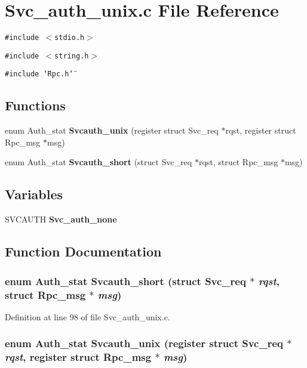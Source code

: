 \section{Svc\_\-auth\_\-unix.c File Reference}
\label{Svc__auth__unix_8c}
{\tt \#include $<$stdio.h$>$}\par
{\tt \#include $<$string.h$>$}\par
{\tt \#include \char`\"{}Rpc.h\char`\"{}}\par
\subsection*{Functions}
\begin{CompactItemize}
\item 
enum Auth\_\-stat {\bf Svcauth\_\-unix} (register struct Svc\_\-req $\ast$rqst, register struct Rpc\_\-msg $\ast$msg)
\item 
enum Auth\_\-stat {\bf Svcauth\_\-short} (struct Svc\_\-req $\ast$rqst, struct Rpc\_\-msg $\ast$msg)
\end{CompactItemize}
\subsection*{Variables}
\begin{CompactItemize}
\item 
SVCAUTH {\bf Svc\_\-auth\_\-none}
\end{CompactItemize}


\subsection{Function Documentation}
\subsubsection{\setlength{\rightskip}{0pt plus 5cm}enum Auth\_\-stat Svcauth\_\-short (struct Svc\_\-req $\ast$ {\em rqst}, struct Rpc\_\-msg $\ast$ {\em msg})}\label{Svc__auth__unix_8c_a2}




Definition at line 98 of file Svc\_\-auth\_\-unix.c.
\subsubsection{\setlength{\rightskip}{0pt plus 5cm}enum Auth\_\-stat Svcauth\_\-unix (register struct Svc\_\-req $\ast$ {\em rqst}, register struct Rpc\_\-msg $\ast$ {\em msg})}\label{Svc__auth__unix_8c_a1}




